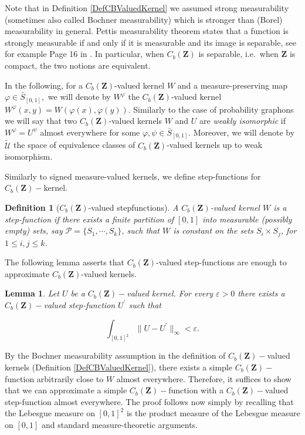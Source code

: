 \documentclass[11pt]{article}
\newtheorem{lemma}[theorem]{Lemma}
\newtheorem{definition}[theorem]{Definition}
\newcommand{\cU}{{\mathcal U}}  %
\newcommand{\Space}{\mathbf{Z}}
\newcommand{\CbFunct}{C_b(\Space)}
\newcommand{\Relabel}{\bar{S}_{[0,1]}}
\begin{document}
Note that in Definition \ref{DefCBValuedKernel} we assumed strong measurability (sometimes also called Bochner measurability) which is stronger than (Borel) measurability in general. Pettis measurability theorem states that a function is strongly measurable if and only if it is measurable and its image is separable, see for example Page 16 in \cite{StrongMeasEquivMeasSeparNBanach}. In particular, when $\CbFunct$ is separable, i.e.\ when $\Space$ is compact, the two notions are equivalent.

In the following, for a $\CbFunct$-valued kernel $W$ and a measure-preserving map $\varphi\in \Relabel,$ we will denote by $W^{\varphi}$ the $\CbFunct$-valued kernel $W^{\varphi}(x,y)=W(\varphi(x),\varphi(y)).$ Similarly to the case of probability graphons we will say that two $\CbFunct$-valued kernels $W$ and $U$ are \emph{weakly isomorphic} if $W^{\varphi}=U^{\psi}$ almost everywhere for some $\varphi,\psi \in \Relabel.$ Moreover, we will denote by $\widetilde{\cU}$ the space of equivalence classes of $\CbFunct$-valued kernels up to weak isomorphism.
    
Similarly to signed measure-valued kernels, we define step-functions for $\CbFunct-$kernel.

\begin{definition}[$\CbFunct$-valued stepfunctions]
  \label{def:stepfunctionCb}
  A $\CbFunct$-valued kernel $W$ is a \emph{step-function} if there exists a
  finite partition of $[0,1]$ into measurable (possibly empty) sets, say
  $\mathcal{P}=\{S_1,\cdots,S_k\}$, such that $W$ is constant on the sets
  $S_i \times  S_j$, for $1\leq i,j\leq  k$.  
\end{definition}

The following lemma asserts that $\CbFunct$-valued step-functions are enough to approximate $\CbFunct$-valued kernels.

\begin{lemma}\label{LemmApproxCbkernelsGeneral}
Let $U$ be a $\CbFunct-$valued kernel. For every $\varepsilon>0$ there exists a $\CbFunct-$valued step-function $U^{\prime}$ such that 

$$
\int_{[0,1]^2}\|U-U^{\prime}\|_{\infty}<\varepsilon.
$$
\end{lemma}
 \proof 
By the Bochner measurability assumption in the definition of $\CbFunct-$valued kernels (Definition \ref{DefCBValuedKernel}), there exists a simple $\CbFunct-$function arbitrarily close to $W$ almost everywhere. Therefore, it suffices to show that we can approximate a simple $\CbFunct-$function with a $\CbFunct-$valued step-function almost everywhere. The proof follows now simply by recalling that the Lebesgue measure on $[0,1]^2$ is the product measure of the Lebesgue measure on $[0,1]$ and standard measure-theoretic arguments. 
 \endproof
\end{document}
